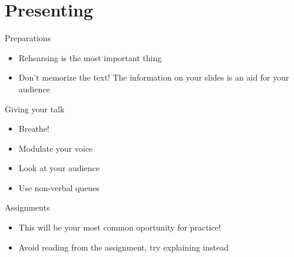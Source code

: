 \documentclass{beamer}
\begin{document}
\section{Presenting}

\begin{frame}[t]{Preparations}
    \begin{itemize}
        \item Rehearsing is the most important thing
        \item Don't memorize the text! The information on your slides is an aid for your audience
    \end{itemize}
\end{frame}
\begin{frame}[t]{Giving your talk}
    \begin{itemize}
        \item Breathe!
        \item Modulate your voice
        \item Look at your audience
        \item Use non-verbal queues
    \end{itemize}
\end{frame}

\begin{frame}[t]{Assignments}
    \begin{itemize}
        \item This will be your most common oportunity for practice!
        \item Avoid reading from the assignment, try explaining instead
    \end{itemize}
\end{frame}
\end{document}

